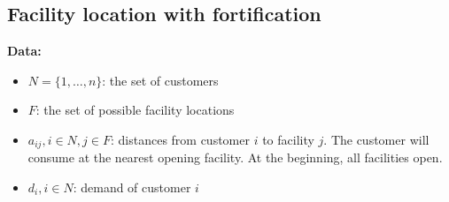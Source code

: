 \documentclass[11pt]{article}
\newcommand{\RR}{\mathbb{R}}
\begin{document}
%

\newpage
\subsection{Facility location with fortification}

\textbf{Data: } 
\begin{itemize}
	\item $N = \{1, \ldots, n\}$: the set of customers 
	\item $F$: the set of possible facility locations
	\item $a_{ij}, i\in N, j\in F$: distances from customer $i$ to facility $j$. The customer will consume at the nearest opening facility. At the beginning, all facilities open.
	\item $d_i, i\in N$: demand of customer $i$
\end{itemize}
\end{document}
